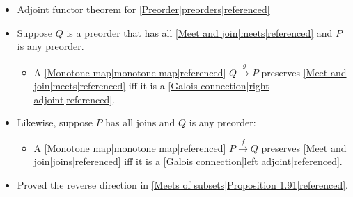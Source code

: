 

\begin{itemize}
    \item Adjoint functor theorem for \ref{Preorder|preorders|referenced}
    \item Suppose $Q$ is a preorder that has all \ref{Meet and join|meets|referenced} and $P$ is any preorder.
          \begin{itemize}
            \item A \ref{Monotone map|monotone map|referenced} $Q \xrightarrow{g} P$ preserves \ref{Meet and join|meets|referenced} iff it is a \ref{Galois connection|right adjoint|referenced}.
          \end{itemize}
    \item Likewise, suppose $P$ has all joins and $Q$ is any preorder:
          \begin{itemize}
            \item A \ref{Monotone map|monotone map|referenced} $P \xrightarrow{f} Q$ preserves \ref{Meet and join|joins|referenced} iff it is a \ref{Galois connection|left adjoint|referenced}.\end{itemize}
    \item Proved the reverse direction in \ref{Meets of subsets|Proposition 1.91|referenced}.
  \end{itemize}